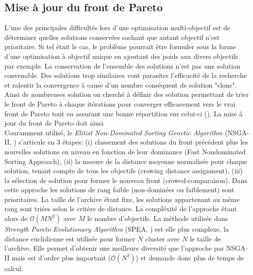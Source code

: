 \subsection{Mise à jour du front de Pareto} %
\label{sub:mise_a_jour_du_front_de_pareto}
L’une des principales difficultés lors d’une optimisation multi-objectif est de
déterminer quelles solutions conservées sachant que autant objectif n’est prioritaire.
Si tel était le cas, le problème pourrait être formuler sous la forme d’une optimisation
à objectif unique en ajoutant des poids aux divers objectifs par exemple.
La conservation de l’ensemble des solutions n’est pas une solution convenable. Des
solutions trop similaires vont parasiter l’efficacité de la recherche et ralentir la
convergence à cause d’un nombre conséquent de solution "clone".
Ainsi de nombreuses solution on cherché à définir des solution permettant de trier
le front de Pareto à chaque itérations pour converger efficacement vers le vrai front
de Pareto tout en assurant une bonne répartition sur celui-ci (\cite{Laumanns2002263}).
La mise à jour du front de Pareto doit ainsi
\\

Couramment utilisé, le \emph{Elitist Non-Dominated
Sorting Genetic Algorithm} (NSGA-II, \cite{Deb2002182}) s’articule en 3 étapes:
(i) classement des solutions du front précédent plus les nouvelles solutions
en niveau en fonction de leur dominance (Fast Nondominated Sorting Approach),
(ii) la mesure de la distance moyenne normalisée pour chaque
solution, tenant compte de tous les objectifs (crowing distance assignment), (iii)
la sélection de solution pour former le nouveau front (crowed-comparaison).
Dans cette approche les solutions de rang faible (non-dominées ou faiblement)
sont prioritaires. La taille de l’archive étant fixe, les solutions appartenant au
même rang sont triées selon le critère de distance. La compléxité de l’approche
étant alors de $\mathcal{O} \left (MN^{2} \right)$ avec $M$ le nombre d’objectifs.
La méthode utilisée dans \emph{Strength Pareto Evolutionary Algorithm} (SPEA, \cite{Zitzler1999257})
est elle plus complexe, la distance euclidienne est utilisée pour former $N$ cluster
avec $N$ le taille de l’archive. Elle permet
d’obtenir une meilleure diversité que l’approche par NSGA-II mais est d’ordre plus
important ($\mathcal{O} \left (N^{3} \right)$) et demande donc plus de temps de calcul.

